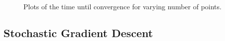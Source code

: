 \documentclass[11pt]{article}
\begin{document}
\begin{figure}[htbp]
  \centering
   \\
   \\
   \\
  \caption{Plots of the time until convergence for varying number of points.}
  \label{fig:TimeIter}
\end{figure}


\subsection{Stochastic Gradient Descent}
\end{document}
